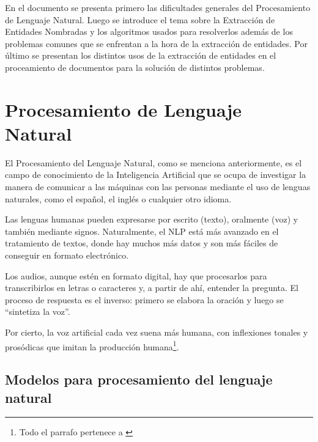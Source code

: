 \documentclass[runningheads]{llncs}
\begin{document}
En el documento se presenta primero las dificultades generales del Procesamiento de Lenguaje Natural. Luego se introduce el tema sobre la Extracción de Entidades Nombradas y los algoritmos usados para resolverlos además de los problemas comunes que se enfrentan a la hora de la extracción de entidades. Por último se presentan los distintos usos de la extracción de entidades en el proceamiento de documentos para la solución de distintos problemas.

\section{Procesamiento de Lenguaje Natural}

El Procesamiento del Lenguaje Natural, como se menciona anteriormente, es el campo de conocimiento de la Inteligencia Artificial que se ocupa de investigar la manera de comunicar a las máquinas con las personas mediante el uso de lenguas naturales, como el español, el inglés o cualquier 
otro idioma.

Las lenguas humanas pueden expresarse por escrito (texto), oralmente (voz) y también mediante signos. Naturalmente, el NLP está más avanzado en el tratamiento de textos, donde hay muchos más datos y son más fáciles de conseguir en formato electrónico.

Los audios, aunque estén en formato digital, hay que procesarlos para transcribirlos en letras o caracteres y, a partir de ahí, entender la pregunta. El proceso de respuesta es el inverso: primero se elabora la oración y luego se “sintetiza la voz”.

Por cierto, la voz artificial cada vez suena más humana, con inflexiones tonales y prosódicas que imitan la producción humana\footnote{Todo el parrafo pertenece a \cite{nlp}}.



\subsection{Modelos para procesamiento del lenguaje natural}
\end{document}
